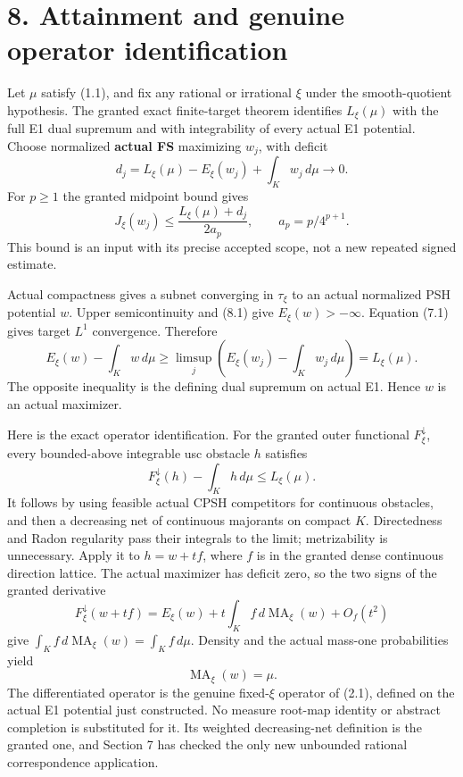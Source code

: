 \documentclass[
  10pt,
]{article}
\begin{document}
\section{8. Attainment and genuine operator
identification}\label{attainment-and-genuine-operator-identification}

Let \(\mu\) satisfy (1.1), and fix any rational or irrational \(\xi\)
under the smooth-quotient hypothesis. The granted exact finite-target
theorem identifies \(L_\xi(\mu)\) with the full E1 dual supremum and
with integrability of every actual E1 potential. Choose normalized
\textbf{actual FS} maximizing \(w_j\), with deficit \[
d_j=L_\xi(\mu)-E_\xi(w_j)+\int_Kw_j\,d\mu\longrightarrow0.
\] For \(p\ge1\) the granted midpoint bound gives \[
J_\xi(w_j)\le \frac{L_\xi(\mu)+d_j}{2a_p},\qquad a_p=p/4^{p+1}.        \tag{8.1}
\] This bound is an input with its precise accepted scope, not a new
repeated signed estimate.

Actual compactness gives a subnet converging in \(\tau_\xi\) to an
actual normalized PSH potential \(w\). Upper semicontinuity and (8.1)
give \(E_\xi(w)>-\infty\). Equation (7.1) gives target \(L^1\)
convergence. Therefore \[
E_\xi(w)-\int_Kw\,d\mu
 \ge \limsup_j\left(E_\xi(w_j)-\int_Kw_j\,d\mu\right)=L_\xi(\mu).       \tag{8.2}
\] The opposite inequality is the defining dual supremum on actual E1.
Hence \(w\) is an actual maximizer.

Here is the exact operator identification. For the granted outer
functional \(F_\xi^\downarrow\), every bounded-above integrable usc
obstacle \(h\) satisfies \[
F_\xi^\downarrow(h)-\int_Kh\,d\mu\le L_\xi(\mu).
\] It follows by using feasible actual CPSH competitors for continuous
obstacles, and then a decreasing net of continuous majorants on compact
\(K\). Directedness and Radon regularity pass their integrals to the
limit; metrizability is unnecessary. Apply it to \(h=w+tf\), where \(f\)
is in the granted dense continuous direction lattice. The actual
maximizer has deficit zero, so the two signs of the granted derivative
\[
F_\xi^\downarrow(w+tf)=E_\xi(w)+t\int_Kf\,d\operatorname{MA}_\xi(w)+O_f(t^2)
\] give \(\int_Kf\,d\operatorname{MA}_\xi(w)=\int_Kf\,d\mu\). Density
and the actual mass-one probabilities yield \[
\operatorname{MA}_\xi(w)=\mu.                                         \tag{8.3}
\] The differentiated operator is the genuine fixed-\(\xi\) operator of
(2.1), defined on the actual E1 potential just constructed. No measure
root-map identity or abstract completion is substituted for it. Its
weighted decreasing-net definition is the granted one, and Section 7 has
checked the only new unbounded rational correspondence application.
\end{document}
